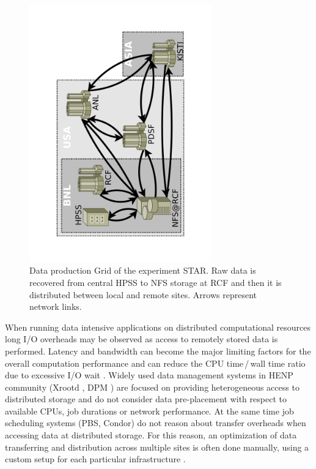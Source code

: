 \documentclass[english]{ddny}
\begin{document}
\begin{figure}[h]
	\begin{center}
		\includegraphics [trim= 30mm 30mm 30mm 30mm , clip, angle =-90, width=0.7\textwidth]{pic/sites.pdf}
	\end{center}
	\caption{Data production Grid of the experiment STAR. Raw data is recovered from central HPSS to NFS storage at RCF and then it is distributed between local and remote sites. Arrows represent network links.}
	\label{sites}
\end{figure} 	

When running data intensive applications on distributed computational resources long I/O overheads may be observed as access to remotely stored data is performed. Latency and bandwidth can become the major limiting factors for the overall computation performance and can reduce the CPU time\,/\,wall time ratio due to excessive I/O wait \cite{Betev,HorkyACAT}.  Widely used data management systems in HENP community (Xrootd \cite{Xrootd}, DPM \cite{DPM}) are focused on providing heterogeneous access to distributed storage and do not consider data pre-placement with respect to available CPUs, job durations or network performance. At the same time job scheduling systems (PBS, Condor) do not reason about transfer overheads when accessing data at distributed storage. For this reason, an optimization of data transferring and distribution across multiple sites is often done manually, using a custom setup for each particular infrastructure \cite{Balewski}.
\end{document}
